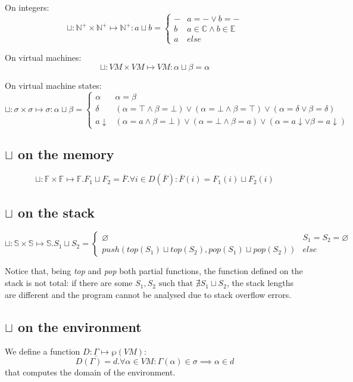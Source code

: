 \documentclass{amsart}
\newcommand{\N}{\mathbb{N}}
\newcommand{\E}{\mathbb{E}}
\newcommand{\C}{\mathbb{C}}
\newcommand{\bF}{\mathbb{F}}
\newcommand{\bS}{\mathbb{S}}
\newcommand{\down}[1]{#1\downarrow}
\newcommand{\Int}{\N^+}
\newcommand{\Gset}{\underline{\Gamma}}
\renewcommand{\emptyset}{\varnothing}
\numberwithin{equation}{section}
\theoremstyle{plain} %
\theoremstyle{definition}
\theoremstyle{remark}
\begin{document}
On integers:
\[ \sqcup: \Int{} \times \Int{} \mapsto \Int{}: a \sqcup b =
\begin{cases}
- & a = - \vee b = -\\
b & a \in \C{} \wedge b \in \E{} \\
a & else
\end{cases} \]

On virtual machines:
\[ \sqcup: VM \times VM \mapsto VM: \alpha \sqcup \beta = \alpha\]

On virtual machine states:
\[ \sqcup: \sigma \times \sigma \mapsto \sigma: \alpha \sqcup \beta =
\begin{cases}
\alpha & \alpha = \beta\\
\delta & (\alpha = \top \wedge \beta = \bot) \vee (\alpha = \bot \wedge \beta = \top) \vee (\alpha = \delta \vee \beta = \delta)\\
\down{a} & (\alpha = a \wedge \beta = \bot) \vee (\alpha = \bot \wedge \beta = a) \vee (\alpha = \down{a} \vee \beta = \down{a})
\end{cases} \]

\subsection{$\sqcup$ on the memory}
\[\sqcup: \bF{} \times \bF{} \mapsto \bF{}. F_1 \sqcup F_2 = \overline{F}.\forall i \in D(\overline{F}): \overline{F}(i) = F_1(i) \sqcup F_2(i)\]

\subsection{$\sqcup$ on the stack}
\[
\sqcup: \bS{} \times \bS{} \mapsto \bS{}. S_1 \sqcup S_2 =
\begin{cases}
\emptyset & S_1 = S_2 = \emptyset\\
push(top(S_1) \sqcup top(S_2), pop(S_1) \sqcup pop(S_2)) & else
\end{cases}
\]

Notice that, being \emph{top} and \emph{pop} both partial functions, the function defined on the stack is not total: if there are some $S_1, S_2 \text{ such that } \nexists S_1 \sqcup S_2$, the stack lengths are different and the program cannot be analysed due to stack overflow errors.

\subsection{$\sqcup$ on the environment}
We define a function $D: \Gset{} \mapsto \wp(VM)$:\\
\[D(\Gamma) = d.\forall \alpha \in VM: \Gamma(\alpha) \in \sigma \implies \alpha \in d\]
that computes the domain of the environment.
\end{document}
